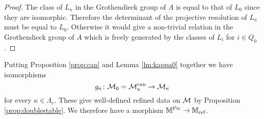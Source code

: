 \documentclass[12pt]{amsart}
\begin{document}
\begin{proof}
The class of $L_\kappa$ in the Grothendieck group of $A$ is equal to that of $L_0$ since they are isomorphic.
Therefore the determinant of the projective resolution of $L_\kappa$ must be equal to $L_0$. Otherwise it would give a non-trivial relation in the Grothendieck group of $A$ which is freely generated by the classes of $L_i$ for $i\in Q_0$.
\end{proof}

Putting Proposition \ref{prop:can} and Lemma \ref{lm:kappa0} together we have isomorphisms $$g_\kappa \colon \mathcal{M}_0 = \mathcal{M}_\kappa^{\text{can}} \rightarrow \mathcal{M}_\kappa$$
for every $\kappa \in \Lambda_r$.
These give well-defined refined data on $\mathcal{M}$  by Proposition \ref{prop:doublestable}.
We therefore have a morphism $\mathbb{M}^{\operatorname{Pic}} \rightarrow \mathbb{M}_\text{ref}$.





\end{document}
